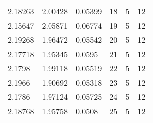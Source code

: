 \begin{table}[htb]
\begin{tabular}{|lll|lll|}
2.18263                        & 2.00428                        & 0.05399                       & 18      & 5         & 12      \\
{\color[HTML]{FE0000} 2.15647} & 2.05871                        & 0.06774                       & 19      & 5         & 12      \\
2.19268                        & 1.96472                        & 0.05542                       & 20      & 5         & 12      \\
2.17718                        & 1.95345                        & 0.0595                        & 21      & 5         & 12      \\
2.1798                         & 1.99118                        & 0.05519                       & 22      & 5         & 12      \\
2.1966                         & {\color[HTML]{FE0000} 1.90692} & 0.05318                       & 23      & 5         & 12      \\
2.1786                         & 1.97124                        & 0.05725                       & 24      & 5         & 12      \\
2.18768                        & 1.95758                        & {\color[HTML]{FE0000} 0.0508} & 25      & 5         & 12      \\ \hline
\end{tabular}
\end{table}

\vspace{0.5cm}



